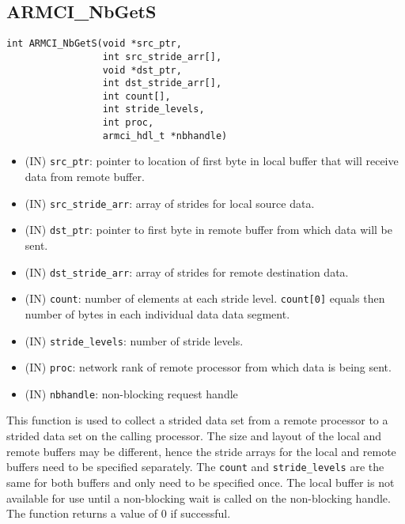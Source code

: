 \documentclass[12pt]{article}
\begin{document}
\subsection{ARMCI\_NbGetS}
\begin{verbatim}
int ARMCI_NbGetS(void *src_ptr,
                 int src_stride_arr[],
                 void *dst_ptr,
                 int dst_stride_arr[],
                 int count[],
                 int stride_levels,
                 int proc,
                 armci_hdl_t *nbhandle)
\end{verbatim}
\begin{itemize}
\item (IN) \texttt{src\_ptr}: pointer to location of first byte in local buffer
that will receive data from remote buffer.
\item (IN) \texttt{src\_stride\_arr}: array of strides for local source data.
\item (IN) \texttt{dst\_ptr}: pointer to first byte in remote buffer from which
data will be sent.
\item (IN) \texttt{dst\_stride\_arr}: array of strides for remote destination data.
\item (IN) \texttt{count}: number of elements at each stride level.
\texttt{count[0]} equals then number of bytes in each individual data data segment.
\item (IN) \texttt{stride\_levels}: number of stride levels.
\item (IN) \texttt{proc}: network rank of remote processor from which data is
being sent.
\item (IN) \texttt{nbhandle}: non-blocking request handle
\end{itemize}
This function is used to collect a strided data set from a remote processor to a
strided data set on the calling processor. The size and layout of the local and
remote buffers may be different, hence the stride arrays for the local and
remote buffers need to be specified separately. The \texttt{count} and
\texttt{stride\_levels} are the same for both buffers and only need to be
specified once. The local buffer is not available for use until a
non-blocking wait is called on the non-blocking handle. The
function returns a value of 0 if successful.
\end{document}
